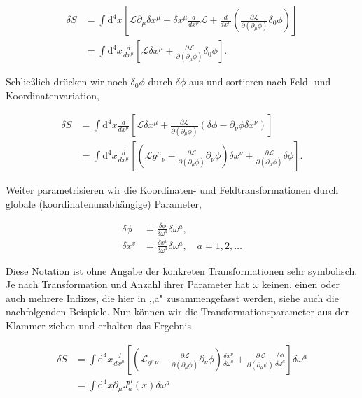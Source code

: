 \documentclass[10pt, letterpaper]{article}
\begin{document}
$$
\begin{aligned}
\delta S & =\int \mathrm{d}^{4} x\left[\mathscr{L} \partial_{\mu} \delta x^{\mu}+\delta x^{\mu} \frac{d}{d x^{\mu}} \mathscr{L}+\frac{d}{d x^{\mu}}\left(\frac{\partial \mathscr{L}}{\partial\left(\partial_{\mu} \phi\right)} \delta_{0} \phi\right)\right] \\
& =\int \mathrm{d}^{4} x \frac{d}{d x^{\mu}}\left[\mathscr{L} \delta x^{\mu}+\frac{\partial \mathscr{L}}{\partial\left(\partial_{\mu} \phi\right)} \delta_{0} \phi\right] .
\end{aligned}
$$

Schließlich drücken wir noch $\delta_{0} \phi$ durch $\delta \phi$ aus und sortieren nach Feld- und Koordinatenvariation,

$$
\begin{aligned}
\delta S & =\int \mathrm{d}^{4} x \frac{d}{d x^{\mu}}\left[\mathscr{L} \delta x^{\mu}+\frac{\partial \mathscr{L}}{\partial\left(\partial_{\mu} \phi\right)}\left(\delta \phi-\partial_{\nu} \phi \delta x^{\nu}\right)\right] \\
& =\int \mathrm{d}^{4} x \frac{d}{d x^{\mu}}\left[\left(\mathscr{L} g^{\mu}{ }_{\nu}-\frac{\partial \mathscr{L}}{\partial\left(\partial_{\mu} \phi\right)} \partial_{\nu} \phi\right) \delta x^{\nu}+\frac{\partial \mathscr{L}}{\partial\left(\partial_{\mu} \phi\right)} \delta \phi\right] .
\end{aligned}
$$

Weiter parametrisieren wir die Koordinaten- und Feldtransformationen durch globale (koordinatenunabhängige) Parameter,

$$
\begin{aligned}
\delta \phi & =\frac{\delta \phi}{\delta \omega^{a}} \delta \omega^{a}, \\
\delta x^{v} & =\frac{\delta x^{v}}{\delta \omega^{a}} \delta \omega^{a}, \quad a=1,2, \ldots
\end{aligned}
$$

Diese Notation ist ohne Angabe der konkreten Transformationen sehr symbolisch. Je nach Transformation und Anzahl ihrer Parameter hat $\omega$ keinen, einen oder auch mehrere Indizes, die hier in ,,a" zusammengefasst werden, siehe auch die nachfolgenden Beispiele. Nun können wir die Transformationsparameter aus der Klammer ziehen und erhalten das Ergebnis

$$
\begin{aligned}
\delta S & =\int \mathrm{d}^{4} x \frac{d}{d x^{\mu}}\left[\left(\mathscr{L}_{g^{\mu}}{ }_{\nu}-\frac{\partial \mathscr{L}}{\partial\left(\partial_{\mu} \phi\right)} \partial_{\nu} \phi\right) \frac{\delta x^{\nu}}{\delta \omega^{a}}+\frac{\partial \mathscr{L}}{\partial\left(\partial_{\mu} \phi\right)} \frac{\delta \phi}{\delta \omega^{a}}\right] \delta \omega^{a} \\
& =\int \mathrm{d}^{4} x \partial_{\mu} J_{a}^{\mu}(x) \delta \omega^{a}
\end{aligned}
$$
\end{document}
